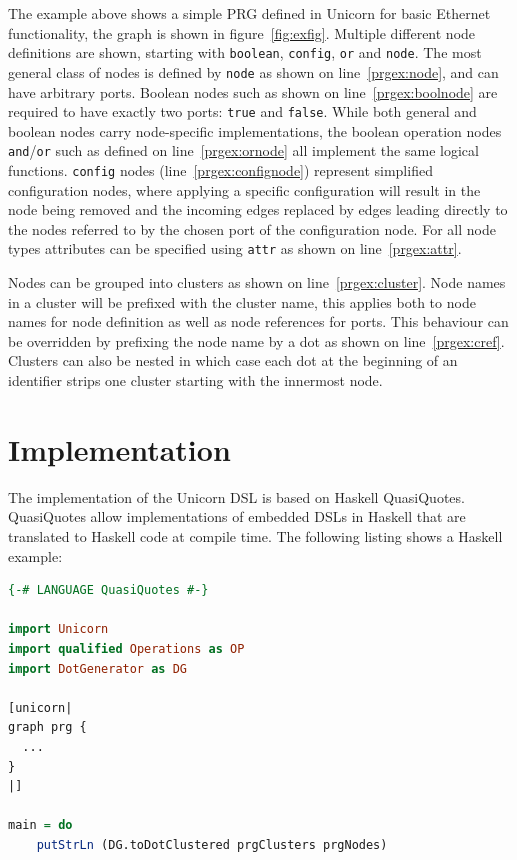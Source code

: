 \documentclass[a4paper]{article}
\begin{document}
The example above shows a simple PRG defined in Unicorn for basic Ethernet
functionality, the graph is shown in figure~\ref{fig:exfig}. Multiple different
node definitions are shown, starting with \texttt{boolean}, \texttt{config},
\texttt{or} and \texttt{node}. The most general class of nodes is defined by
\texttt{node} as shown on line~\ref{prgex:node}, and can have arbitrary ports.
Boolean nodes such as shown on line~\ref{prgex:boolnode} are required to have
exactly two ports: \texttt{true} and \texttt{false}. While both general and
boolean nodes carry node-specific implementations, the boolean operation nodes
\texttt{and}/\texttt{or} such as defined on line~\ref{prgex:ornode} all
implement the same logical functions. \texttt{config} nodes
(line~\ref{prgex:confignode}) represent simplified configuration nodes, where
applying a specific configuration will result in the node being removed and the
incoming edges replaced by edges leading directly to the nodes referred to by
the chosen port of the configuration node. For all node types attributes can be
specified using \texttt{attr} as shown on line~\ref{prgex:attr}.

Nodes can be grouped into clusters as shown on line~\ref{prgex:cluster}. Node
names in a cluster will be prefixed with the cluster name, this applies both to
node names for node definition as well as node references for ports. This
behaviour can be overridden by prefixing the node name by a dot as shown on
line~\ref{prgex:cref}. Clusters can also be nested in which case each dot at the
beginning of an identifier strips one cluster starting with the innermost node.




\section*{Implementation}
The implementation of the Unicorn DSL is based on Haskell QuasiQuotes.
QuasiQuotes allow implementations of embedded DSLs in Haskell that are
translated to Haskell code at compile time. The following listing shows a
Haskell example:

\begin{lstlisting}[language=haskell]
{-# LANGUAGE QuasiQuotes #-}

import Unicorn
import qualified Operations as OP
import DotGenerator as DG

[unicorn|
graph prg {
  ...
}
|]

main = do
    putStrLn (DG.toDotClustered prgClusters prgNodes)
\end{lstlisting}
\end{document}
